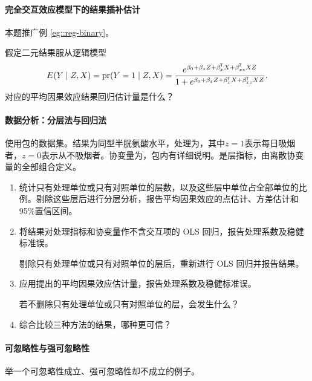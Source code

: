 \paragraph{完全交互效应模型下的结果插补估计}\label{hw::outcome-two-logit}

本题推广例 \ref{eg::reg-binary}。 

假定二元结果服从逻辑模型
$$
E(Y\mid Z, X) = \textup{pr}(Y =1\mid Z, X) = \frac{   e^{\beta_0 + \beta_z Z + \beta_x ^{\mkern-1.5mu\mathsf{T}} X + \beta_{xz}  ^{\mkern-1.5mu\mathsf{T}} X Z }  }
{ 1+ e^{\beta_0 + \beta_z Z + \beta_x ^{\mkern-1.5mu\mathsf{T}} X + \beta_{xz}  ^{\mkern-1.5mu\mathsf{T}} X Z} } .
$$
对应的平均因果效应结果回归估计量是什么？

\paragraph{数据分析：分层法与回归法}\label{hw::stratification-example-rosenbaum}

使用包的数据集。结果为同型半胱氨酸水平，处理为，其中$z=1$表示每日吸烟者，$z=0$表示从不吸烟者。协变量为，包内有详细说明。是层指标，由离散协变量的全部组合定义。


\begin{enumerate}
[(1)]
\item
统计只有处理单位或只有对照单位的层数，以及这些层中单位占全部单位的比例。剔除这些层后进行分层分析，报告平均因果效应的点估计、方差估计和95\%置信区间。

\item
将结果对处理指标和协变量作不含交互项的 OLS 回归，报告处理系数及稳健标准误。

剔除只有处理单位或只有对照单位的层后，重新进行 OLS 回归并报告结果。


\item
应用\citet{lin2013}提出的平均因果效应估计量，报告处理系数及稳健标准误。

若不删除只有处理单位或只有对照单位的层，会发生什么？


\item
综合比较三种方法的结果，哪种更可信？

\end{enumerate} 



\paragraph{可忽略性与强可忽略性}\label{hw::ignorability-difference}


举一个可忽略性成立、强可忽略性却不成立的例子。 


